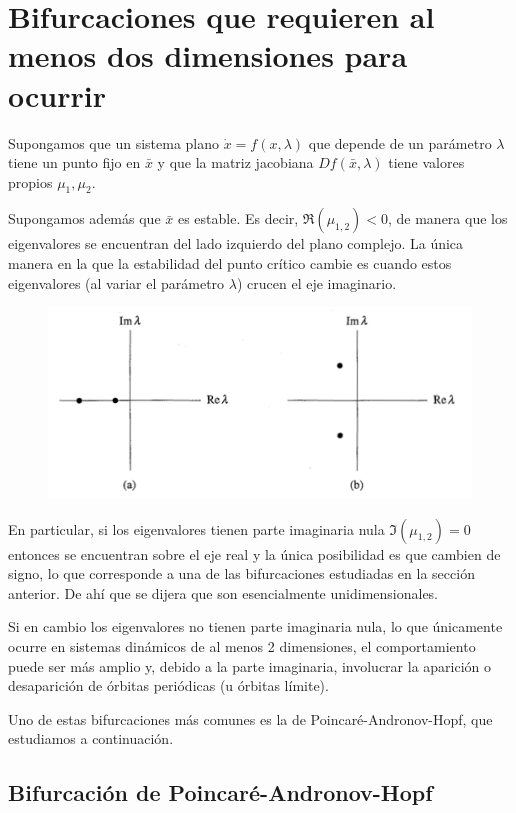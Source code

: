 \documentclass[11pt]{book}
\theoremstyle{definition}
\numberwithin{definition}{section}
\theoremstyle{theorem}
\numberwithin{theorem}{section}
\numberwithin{lemma}{section}
\numberwithin{corollary}{section}
\theoremstyle{plain}
\numberwithin{example}{section}
\begin{document}
\section{Bifurcaciones que requieren al menos dos dimensiones para ocurrir}

Supongamos que un sistema plano $\dot{x} = f(x, \lambda)$ que depende de un parámetro $\lambda$ tiene un punto fijo en $\bar{x}$ y que la matriz jacobiana $Df(\bar{x}, \lambda)$ tiene valores propios $\mu_1, \mu_2$.

Supongamos además que $\bar{x}$ es estable. Es decir, $\Re(\mu_{1,2}) < 0$, de manera que los eigenvalores se encuentran del lado izquierdo del plano complejo.
La única manera en la que la estabilidad del punto crítico cambie es cuando estos eigenvalores (al variar el parámetro $\lambda$) crucen el eje imaginario.

\begin{figure}[ht] \centering
    \includegraphics[scale=0.8]{figures/bifurcations-2dimensional.png} 
\end{figure}

En particular, si los eigenvalores tienen parte imaginaria nula $\Im(\mu_{1,2}) = 0$ entonces se encuentran sobre el eje real y la única posibilidad es que cambien de signo, lo que corresponde a una de las bifurcaciones estudiadas en la sección anterior.
De ahí que se dijera que son esencialmente unidimensionales.

Si en cambio los eigenvalores no tienen parte imaginaria nula, lo que únicamente ocurre en sistemas dinámicos de al menos 2 dimensiones, el comportamiento puede ser más amplio y, debido a la parte imaginaria, involucrar la aparición o desaparición de órbitas periódicas (u órbitas límite).

Uno de estas bifurcaciones más comunes es la de Poincaré-Andronov-Hopf, que estudiamos a continuación.

\subsection{Bifurcación de Poincaré-Andronov-Hopf}
\end{document}
